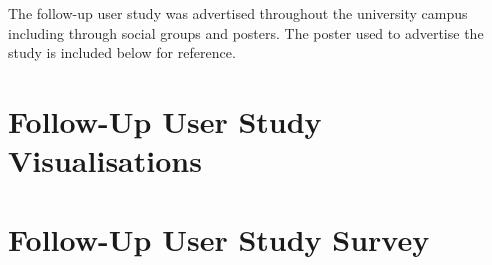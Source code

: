 The follow-up user study was advertised throughout the university campus including through social groups and posters. The poster used to advertise the study is included below for reference.

\begin{center}
\end{center}

\chapter{Follow-Up User Study Visualisations}

\chapter{Follow-Up User Study Survey}

\clearpage


